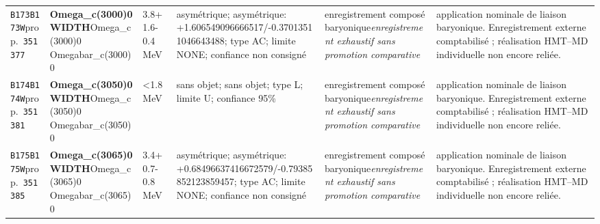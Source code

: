\begin{landscape}
\begin{longtable}{L{1.85cm}L{4.45cm}L{2.35cm}L{4.05cm}L{3.35cm}L{7.15cm}}
\texttt{B173}\newline \texttt{B173W}\newline prop.\ \texttt{351377} & \textbf{Omega\_\allowbreak{}c(3000)0 WIDTH}\newline Omega\_\allowbreak{}c(3000)0 \textbar{}\allowbreak{} Omegabar\_\allowbreak{}c(3000)0 & 3.8+1.6-0.4\,MeV & asymétrique; asymétrique: +1.606549096666517/-0.37013511046643488; type AC; limite NONE; confiance non consigné & enregistrement composé baryonique\newline \emph{enregistrement exhaustif sans promotion comparative} & application nominale de liaison baryonique. Enregistrement externe comptabilisé ; réalisation HMT--MD individuelle non encore reliée. \\
\texttt{B174}\newline \texttt{B174W}\newline prop.\ \texttt{351381} & \textbf{Omega\_\allowbreak{}c(3050)0 WIDTH}\newline Omega\_\allowbreak{}c(3050)0 \textbar{}\allowbreak{} Omegabar\_\allowbreak{}c(3050)0 & \textless{}1.8\,MeV & sans objet; sans objet; type L; limite U; confiance 95\% & enregistrement composé baryonique\newline \emph{enregistrement exhaustif sans promotion comparative} & application nominale de liaison baryonique. Enregistrement externe comptabilisé ; réalisation HMT--MD individuelle non encore reliée. \\
\texttt{B175}\newline \texttt{B175W}\newline prop.\ \texttt{351385} & \textbf{Omega\_\allowbreak{}c(3065)0 WIDTH}\newline Omega\_\allowbreak{}c(3065)0 \textbar{}\allowbreak{} Omegabar\_\allowbreak{}c(3065)0 & 3.4+0.7-0.8\,MeV & asymétrique; asymétrique: +0.68496637416672579/-0.79385852123859457; type AC; limite NONE; confiance non consigné & enregistrement composé baryonique\newline \emph{enregistrement exhaustif sans promotion comparative} & application nominale de liaison baryonique. Enregistrement externe comptabilisé ; réalisation HMT--MD individuelle non encore reliée. \\

\end{longtable}
\end{landscape}
